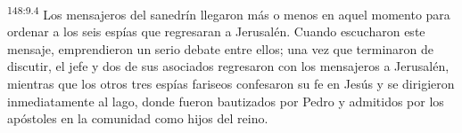 \par
\textsuperscript{148:9.4} Los mensajeros del sanedrín llegaron más o menos en aquel momento para ordenar a los seis espías que regresaran a Jerusalén. Cuando escucharon este mensaje, emprendieron un serio debate entre ellos; una vez que terminaron de discutir, el jefe y dos de sus asociados regresaron con los mensajeros a Jerusalén, mientras que los otros tres espías fariseos confesaron su fe en Jesús y se dirigieron inmediatamente al lago, donde fueron bautizados por Pedro y admitidos por los apóstoles en la comunidad como hijos del reino.